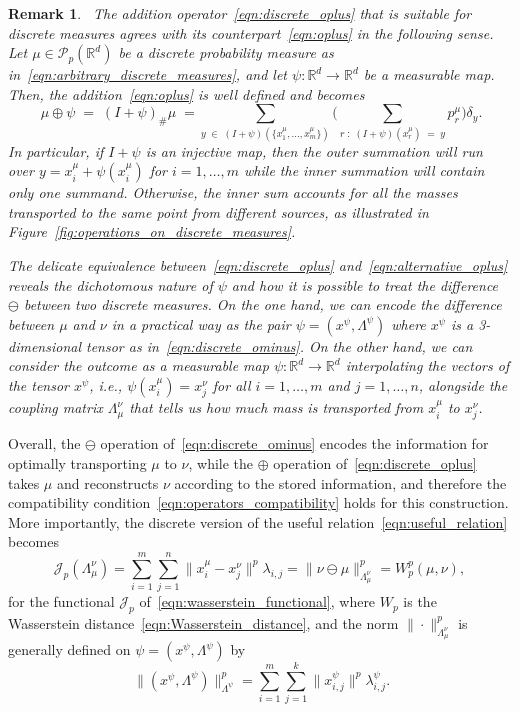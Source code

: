 \documentclass[12pt]{amsart}
\newtheorem{remark}{Remark}[section]
\begin{document}
\begin{remark}~\label{remark:psi_dichotomy}
    The addition operator~\eqref{eqn:discrete_oplus} that is suitable for discrete measures agrees with its counterpart~\eqref{eqn:oplus} in the following sense. Let $\mu\in\mathcal{P}_p(\mathbb{R}^d)$ be a discrete probability measure as in~\eqref{eqn:arbitrary_discrete_measures}, and let $\psi:\mathbb{R}^d\rightarrow\mathbb{R}^d$ be a measurable map. Then, the addition~\eqref{eqn:oplus} is well defined and becomes
    \begin{equation}~\label{eqn:alternative_oplus}
        \mu\oplus\psi \;=\;(I+\psi)_\#\mu \;= \sum_{y\;\in\;(I+\psi)(\{x^\mu_1,\dots,x^\mu_m\})}\bigg(\sum_{r\;:\; (I+\psi)(x^\mu_r)\;=\;y}p^\mu_r\bigg)\delta_{y}.
    \end{equation}
    In particular, if $I+\psi$ is an injective map, then the outer summation will run over $y=x^\mu_i+\psi(x^\mu_i)$ for $i=1,\dots, m$ while the inner summation will contain only one summand. Otherwise, the inner sum accounts for all the masses transported to the same point from different sources, as illustrated in Figure~\ref{fig:operations_on_discrete_measures}.
    
    The delicate equivalence between~\eqref{eqn:discrete_oplus} and~\eqref{eqn:alternative_oplus} reveals the dichotomous nature of $\psi$ and how it is possible to treat the difference $\ominus$ between two discrete measures. On the one hand, we can encode the difference between $\mu$ and $\nu$ in a practical way as the pair $\psi=(x^\psi, \Lambda^\psi)$ where $x^\psi$ is a 3-dimensional tensor as in~\eqref{eqn:discrete_ominus}. On the other hand, we can consider the outcome as a measurable map $\psi:\mathbb{R}^d\rightarrow\mathbb{R}^d$ interpolating the vectors of the tensor $x^\psi$, i.e., $\psi(x^\mu_i)=x^\nu_j$ for all $i=1,\dots,m$ and $j=1,\dots,n$, alongside the coupling matrix $\Lambda_\mu^\nu$ that tells us how much mass is transported from $x^\mu_i$ to $x^\nu_j$.
\end{remark}

Overall, the $\ominus$ operation of~\eqref{eqn:discrete_ominus} encodes the information for optimally transporting $\mu$ to $\nu$, while the $\oplus$ operation of~\eqref{eqn:discrete_oplus} takes $\mu$ and reconstructs $\nu$ according to the stored information, and therefore the compatibility condition~\eqref{eqn:operators_compatibility} holds for this construction. More importantly, the discrete version of the useful relation~\eqref{eqn:useful_relation} becomes
\begin{equation}
    \mathcal{J}_p(\Lambda_\mu^\nu) = \sum_{i=1}^m \sum_{j=1}^n \|x^\mu_i-x^\nu_j\|^p\lambda_{i,j}=\|\nu\ominus\mu\|^p_{\Lambda_\mu^\nu}=W^p_p(\mu, \nu),
\end{equation}
for the functional $\mathcal{J}_p$ of~\eqref{eqn:wasserstein_functional}, where $W_p$ is the Wasserstein distance~\eqref{eqn:Wasserstein_distance}, and the norm $\|\cdot\|^p_{\Lambda_\mu^\nu}$ is generally defined on $\psi=(x^\psi,\Lambda^\psi)$ by
\begin{equation}~\label{eqn:semi_norm}
   \|(x^\psi,\Lambda^\psi)\|^p_{\Lambda^\psi}=\sum_{i=1}^m\sum_{j=1}^k\|x^\psi_{i,j}\|^p\lambda^\psi_{i,j}.
\end{equation}
\end{document}
